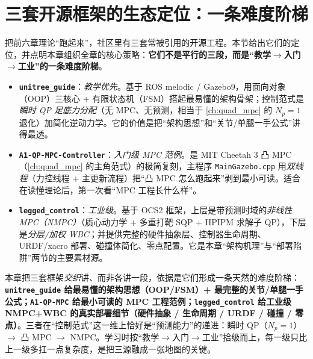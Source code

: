 \section{三套开源框架的生态定位：一条难度阶梯}
\label{sec:qp-ecosystem}

把前六章理论“跑起来”，社区里有三套常被引用的开源工程。本节给出它们的定位，并点明本章组织全章的核心策略：\textbf{它们不是平行的三段，而是“教学$\to$入门$\to$工业”的一条难度阶梯}。

\begin{itemize}
  \item \textbf{\texttt{unitree\_guide}}\cite{unitree2023quadruped}：\emph{教学优先}。基于 ROS melodic / Gazebo9，用面向对象（OOP）三核心 + 有限状态机（FSM）搭起最易懂的架构骨架；控制范式是\emph{瞬时 QP 足底力分配}（无 MPC、无预测，相当于 \cref{ch:quad_mpc} 的 $N_p{=}1$ 退化）加简化逆动力学。它的价值是把“架构思想”和“关节/单腿一手公式”讲得最透。
  \item \textbf{\texttt{A1-QP-MPC-Controller}}\cite{dicarlo2018cheetah}：\emph{入门级 MPC 范例}。是 MIT Cheetah 3 凸 MPC（\cref{ch:quad_mpc} 的主角范式）的极简复刻，主程序 \texttt{MainGazebo.cpp} 用\emph{双线程}（力控线程 + 主更新流程）把“凸 MPC 怎么跑起来”剥到最小可读。适合在读懂理论后，第一次看“MPC 工程长什么样”。
  \item \textbf{\texttt{legged\_control}}\cite{sleiman2021unified}：\emph{工业级}。基于 OCS2 框架，上层是带预测时域的\emph{非线性 MPC（NMPC）}（质心动力学 + 多重打靶 SQP + HPIPM 求解子 QP），下层是\emph{分层/加权 WBC}\cite{bellicoso2016whole}；并提供完整的硬件抽象层、控制器生命周期、URDF/xacro 部署、碰撞体简化、零点配置。它是本章“架构机理”与“部署陷阱”两节的主要素材源。
\end{itemize}

\begin{insight}\label{ins:qp-ladder}
本章把三套框架\emph{交织}讲、而非各讲一段，依据是它们形成一条天然的难度阶梯：\textbf{\texttt{unitree\_guide} 给最易懂的架构思想（OOP/FSM）+ 最完整的关节/单腿一手公式；\texttt{A1-QP-MPC} 给最小可读的 MPC 工程范例；\texttt{legged\_control} 给工业级 NMPC+WBC 的真实部署细节（硬件抽象 / 生命周期 / URDF / 碰撞 / 零点）}。三者在“控制范式”这一维上恰好是“预测能力”的递进：瞬时 QP（$N_p{=}1$）$\to$ 凸 MPC $\to$ NMPC。学习时按“教学$\to$入门$\to$工业”拾级而上，每一级只比上一级多扛一点复杂度，是把三源融成一张地图的关键。
\end{insight}

